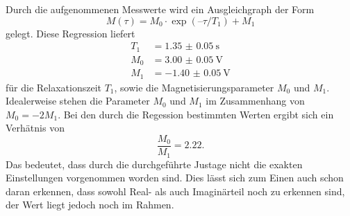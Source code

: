 Durch die aufgenommenen Messwerte wird ein Ausgleichgraph der Form
\begin{equation}
  M(\tau) = M_0 \cdot \exp(–\tau/T_1) + M_1
\end{equation}
gelegt. Diese Regression liefert 
\begin{align}
  T_1 &= \SI{1.35(005)}{\second} \\
  M_0 &= \SI{3.00(005)}{\volt} \\
  M_1 &= \SI{-1.40(005)}{\volt}
\end{align} \noindent
für die Relaxationszeit $T_1$, sowie die Magnetisierungsparameter $M_0$ und $M_1$.
Idealerweise stehen die Parameter $M_0$ und $M_1$ im Zusammenhang von $M_0 = -2M_1$. Bei den durch die Regession bestimmten
Werten ergibt sich ein Verhätnis von
\begin{equation}
  \frac{M_0}{M_1} = 2.22.
\end{equation}
Das bedeutet, dass durch die durchgeführte Justage nicht die exakten Einstellungen vorgenommen worden sind. Dies lässt
sich zum Einen auch schon daran erkennen, dass sowohl Real- als auch Imaginärteil noch zu erkennen sind, der Wert liegt jedoch
noch im Rahmen.

